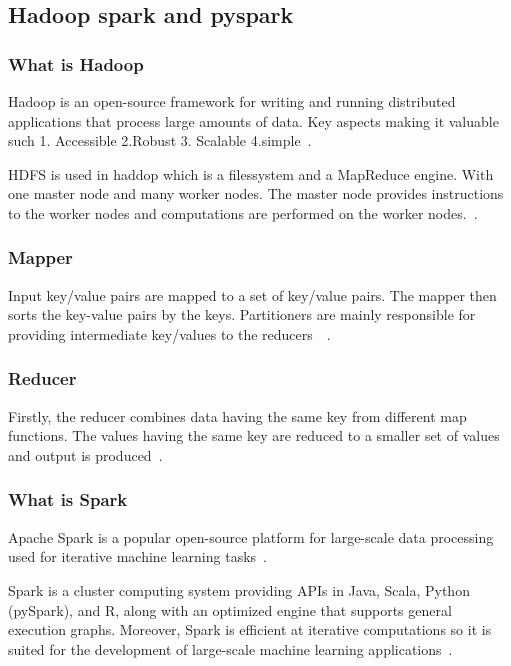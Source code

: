 \documentclass[]{final_report}
\begin{document}
\clearpage

\subsection{Hadoop spark and pyspark}

\subsubsection{What is Hadoop}

Hadoop is an open-source framework for writing and running distributed applications that process large amounts of data.  Key aspects making it valuable such 1. Accessible 2.Robust 3. Scalable 4.simple~\cite{lam_hadoop_2010}.

HDFS is used in haddop which is a filessystem and a MapReduce engine. With one master node and many worker nodes. The master node provides instructions to the worker nodes and computations are performed on the worker nodes.~\cite{hazarika_performance_2017}.

\subsubsection{Mapper}
Input key/value pairs are mapped to a set of key/value pairs. The mapper then sorts the key-value pairs by the keys. Partitioners are mainly responsible for providing intermediate key/values to the reducers~\cite{patel_addressing_2012}~\cite{hazarika_performance_2017}.

\subsubsection{Reducer}

Firstly, the reducer combines data having the same key from different map functions. The values having the same key are reduced to a smaller set of values and output is produced~\cite{hazarika_performance_2017}.

\clearpage

\subsubsection{What is Spark}
Apache Spark is a popular open-source platform for large-scale data processing used for iterative machine learning tasks~\cite{meng_mllib_2016}.

Spark is a cluster computing system providing APIs in Java, Scala, Python (pySpark), and R, along with an optimized engine that supports general execution graphs. Moreover, Spark is efficient at iterative computations so it is suited for the development of large-scale machine learning applications~\cite{meng_mllib_2016}.
\end{document}

